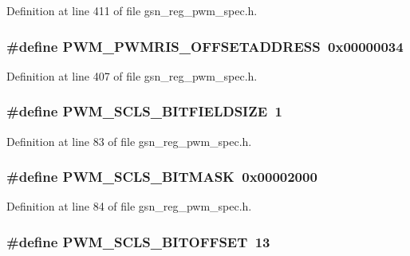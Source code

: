Definition at line 411 of file gsn\_\-reg\_\-pwm\_\-spec.h.

\hypertarget{a00565_ad85bbc1622b6502490eec15b1ab0819b}{
\subsubsection[{PWM\_\-PWMRIS\_\-OFFSETADDRESS}]{\setlength{\rightskip}{0pt plus 5cm}\#define PWM\_\-PWMRIS\_\-OFFSETADDRESS~0x00000034}}
\label{a00565_ad85bbc1622b6502490eec15b1ab0819b}


Definition at line 407 of file gsn\_\-reg\_\-pwm\_\-spec.h.

\hypertarget{a00565_ab2835b9033ec1ff977ed6a335f7d1135}{
\subsubsection[{PWM\_\-SCLS\_\-BITFIELDSIZE}]{\setlength{\rightskip}{0pt plus 5cm}\#define PWM\_\-SCLS\_\-BITFIELDSIZE~1}}
\label{a00565_ab2835b9033ec1ff977ed6a335f7d1135}


Definition at line 83 of file gsn\_\-reg\_\-pwm\_\-spec.h.

\hypertarget{a00565_ab7e8fe07d218f5a5de027c01dfae6ee3}{
\subsubsection[{PWM\_\-SCLS\_\-BITMASK}]{\setlength{\rightskip}{0pt plus 5cm}\#define PWM\_\-SCLS\_\-BITMASK~0x00002000}}
\label{a00565_ab7e8fe07d218f5a5de027c01dfae6ee3}


Definition at line 84 of file gsn\_\-reg\_\-pwm\_\-spec.h.

\hypertarget{a00565_a808cf75beac1131f7c35f3a560fdef11}{
\subsubsection[{PWM\_\-SCLS\_\-BITOFFSET}]{\setlength{\rightskip}{0pt plus 5cm}\#define PWM\_\-SCLS\_\-BITOFFSET~13}}
\label{a00565_a808cf75beac1131f7c35f3a560fdef11}


